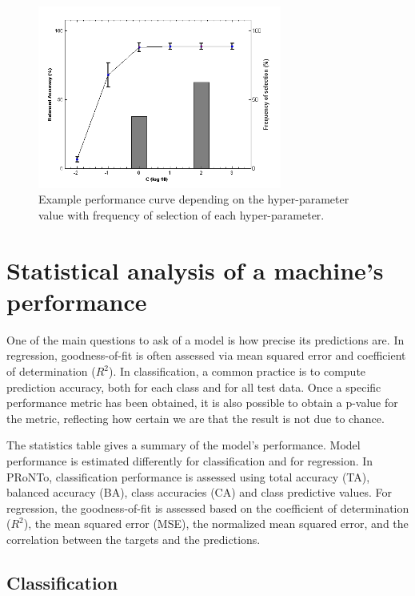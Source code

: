 \begin{figure}[h!]
\begin{center}
\includegraphics[height=6cm]{images/prt_ui_results_plots_hyper.png}
\caption{Example performance curve depending on the hyper-parameter value with frequency of selection of each hyper-parameter.}
\label{fig_prt_ui_results_plots_hyper}
\end{center}
\end{figure}

\section{Statistical analysis of a machine's performance}
\label{s:DisRes_stats}

One of the main questions to ask of a model is how precise its predictions are.
In regression, goodness-of-fit is often assessed via mean squared error and coefficient of determination ($R^2$). In classification, a common practice is to compute prediction accuracy, both for each class and for all test data. Once a specific performance metric has been obtained, it is also possible to obtain a p-value for the metric, reflecting
how certain we are that the result is not due to chance.

The statistics table gives a summary of the model's performance. Model performance is estimated differently for classification and for regression. In PRoNTo, classification performance is assessed using total accuracy (TA), balanced accuracy (BA), class accuracies (CA) and class predictive values. For regression, the goodness-of-fit is assessed based on the coefficient of determination ($R^2$), the mean squared error (MSE), the normalized mean squared error, and the correlation between the targets and the predictions.

\subsection{Classification} 

